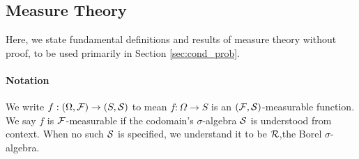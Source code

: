 \subsection{Measure Theory}

Here, we state fundamental definitions and results of measure theory without proof, to be used primarily in Section \ref{sec:cond_prob}.

\paragraph{Notation}
We write $f: \left(\Omega, \mathcal{F}\right) \rightarrow \left(S, \mathcal{S}\right)$ to mean $f: \Omega \rightarrow S$ is an $\left(\mathcal{F}, \mathcal{S}\right)$-measurable function. We say $f$ is $\mathcal{F}$-measurable if the codomain's $\sigma$-algebra $\mathcal{S}$ is understood from context.
When no such $\mathcal{S}$ is specified, we understand it to be $\mathcal{R}$,the Borel $\sigma$-algebra.

